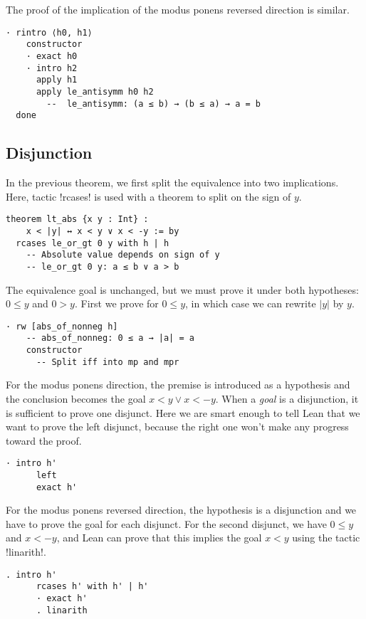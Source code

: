 \newpage

The proof of the implication of the modus ponens reversed direction is similar.
\begin{Verbatim}[firstnumber=last]
  · rintro ⟨h0, h1⟩
    constructor
    · exact h0
    · intro h2
      apply h1
      apply le_antisymm h0 h2
        --  le_antisymm: (a ≤ b) → (b ≤ a) → a = b
  done
\end{Verbatim}


\subsection{Disjunction}

In the previous theorem, we first split the equivalence into two implications. Here, tactic !rcases! is used with a theorem to split on the sign of $y$. \begin{Verbatim}
theorem lt_abs {x y : Int} :
    x < |y| ↔ x < y ∨ x < -y := by
  rcases le_or_gt 0 y with h | h
    -- Absolute value depends on sign of y
    -- le_or_gt 0 y: a ≤ b ∨ a > b
\end{Verbatim}

The equivalence goal is unchanged, but we must prove it under both hypotheses: $0\leq y$ and $0>y$. First we prove for $0\leq y$, in which case we can rewrite $|y|$ by $y$.
\begin{Verbatim}[firstnumber=last]
  · rw [abs_of_nonneg h]
    -- abs_of_nonneg: 0 ≤ a → |a| = a
    constructor
      -- Split iff into mp and mpr
\end{Verbatim}
For the modus ponens direction, the premise is introduced as a hypothesis and the  conclusion becomes the goal $x < y \vee x < -y$. When a \emph{goal} is a disjunction, it is sufficient to prove one disjunct. Here we are smart enough to tell Lean that we want to prove the left disjunct, because the right one won't make any progress toward the proof.
\begin{Verbatim}[firstnumber=last]
    · intro h'
      left
      exact h'
\end{Verbatim}
For the modus ponens reversed direction, the hypothesis is a disjunction and we have to prove the goal for each disjunct. For the second disjunct, we have $0 ≤ y$ and $x < -y$, and Lean can prove that this implies the goal $x < y$ using the tactic !linarith!.

\begin{Verbatim}[firstnumber=last]
    . intro h'
      rcases h' with h' | h'
      · exact h'
      . linarith
\end{Verbatim}

